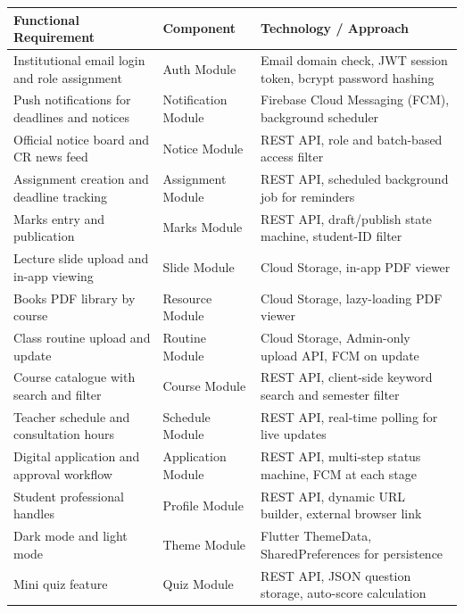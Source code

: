 \documentclass[12pt,a4paper]{article}
\newcommand{\THH}[1]{\small\bfseries\color{white} #1}
\begin{document}
\vspace{0.4em}
\begin{longtable}{|p{4.5cm}|p{3.8cm}|p{5.2cm}|}
\hline
\rowcolor{navyblue}
\THH{Functional Requirement} & \THH{Component} & \THH{Technology / Approach} \\
\hline
\endhead
Institutional email login and role assignment &
Auth Module &
Email domain check, JWT session token, bcrypt password hashing \\
\hline
Push notifications for deadlines and notices &
Notification Module &
Firebase Cloud Messaging (FCM), background scheduler \\
\hline
Official notice board and CR news feed &
Notice Module &
REST API, role and batch-based access filter \\
\hline
Assignment creation and deadline tracking &
Assignment Module &
REST API, scheduled background job for reminders \\
\hline
Marks entry and publication &
Marks Module &
REST API, draft/publish state machine, student-ID filter \\
\hline
Lecture slide upload and in-app viewing &
Slide Module &
Cloud Storage, in-app PDF viewer \\
\hline
Books PDF library by course &
Resource Module &
Cloud Storage, lazy-loading PDF viewer \\
\hline
Class routine upload and update &
Routine Module &
Cloud Storage, Admin-only upload API, FCM on update \\
\hline
Course catalogue with search and filter &
Course Module &
REST API, client-side keyword search and semester filter \\
\hline
Teacher schedule and consultation hours &
Schedule Module &
REST API, real-time polling for live updates \\
\hline
Digital application and approval workflow &
Application Module &
REST API, multi-step status machine, FCM at each stage \\
\hline
Student professional handles &
Profile Module &
REST API, dynamic URL builder, external browser link \\
\hline
Dark mode and light mode &
Theme Module &
Flutter ThemeData, SharedPreferences for persistence \\
\hline
Mini quiz feature &
Quiz Module &
REST API, JSON question storage, auto-score calculation \\
\hline
\end{longtable}
\newpage
\end{document}
